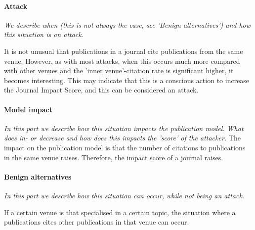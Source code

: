 \documentclass{ou-report}
\newcommand{\outline}[1]{{\color{blue} #1}}
\begin{document}
\paragraph{Attack}
\textit{We describe when (this is not always the case, see 'Benign 
alternatives') and how this situation is an attack.} 

It is not unusual that 
publications in a journal cite publications from the same venue. However, as
with most attacks, when this occurs much more 
compared with other venues and the 'inner venue'-citation rate is significant higher, it becomes 
interesting. This may indicate that this is a conscious action to increase
the Journal Impact Score, and this can be considered an attack.

\paragraph{Model impact}
\textit{In this part we describe how this situation impacts the publication 
model. What does in- or decrease and how does this impacts the 'score' 
of the attacker.}
The impact on the publication model is that the number of citations to 
publications in the same venue raises. Therefore, the impact score of a journal
raises. 

\paragraph{Benign alternatives}
\textit{In this part we describe how this situation can occur, while not being
an attack.} 

If a certain venue is that specialised in a certain topic, the 
situation where a publications cites other publications in that venue can occur.







\end{document}
